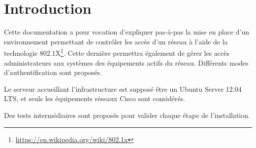 \section{Introduction}

Cette documentation a pour vocation d'expliquer pas-à-pas la mise en place d'un environnement permettant de contrôler les accès d'un réseau à l'aide de la technologie 802.1X\footnote{\url{https://en.wikipedia.org/wiki/802.1x}}. Cette dernière permettra également de gérer les accès administrateurs aux systèmes des équipements actifs du réseau. Différents modes d'authentification sont proposés.

Le serveur accueillant l'infrastructure est supposé être un Ubuntu Server 12.04 LTS, et seuls les équipements réseaux Cisco sont considérés.

Des tests intermédiaires sont proposés pour valider chaque étape de l'installation.
